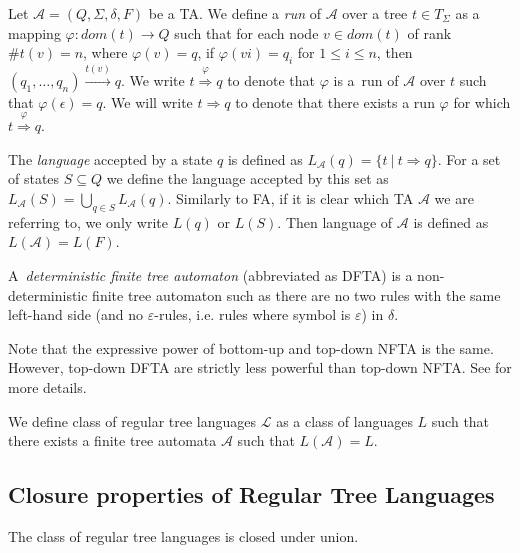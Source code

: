 Let $\mathcal{A} = (Q, \Sigma, \delta, F)$ be a TA. We define a \emph{run} of $\mathcal{A}$ over a tree $t \in T_\Sigma$ as a mapping $\varphi: dom(t) \to Q$ such that for each node $v \in dom(t)$ of rank $\#t(v) = n$, where $\varphi(v) = q$, if $\varphi(vi) = q_i$ for $1 \leq i \leq n$, then $(q_1,\ldots,q_n) \overset{t(v)}{\longrightarrow} q$. We write $t \overset{\varphi}{\Longrightarrow} q$ to denote that $\varphi$ is a~run of $\mathcal{A}$ over $t$ such that $\varphi(\epsilon) = q$. We will write $t \Longrightarrow q$ to denote that there exists a run $\varphi$ for which $t \overset{\varphi}{\Longrightarrow} q$.

The \emph{language} accepted by a state $q$ is defined as $L_{\mathcal{A}}(q) = \{t\ |\ t \Rightarrow q\}$. For a set of states $S \subseteq Q$ we define the language accepted by this set as $L_{\mathcal{A}}(S) = \bigcup_{q \in S} L_{\mathcal{A}}(q)$. Similarly to FA, if it is clear which TA $\mathcal{A}$ we are referring to, we only write $L(q)$ or $L(S)$. Then language of $\mathcal{A}$ is defined as $L(\mathcal{A}) = L(F)$.

\begin{defz}
A~\emph{deterministic finite tree automaton} (abbreviated as DFTA) is a non-deterministic finite tree automaton such as there are no two rules with the same left-hand side (and no $\varepsilon$-rules, i.e. rules where symbol is $\varepsilon$) in $\delta$.
\end{defz}

Note that the expressive power of bottom-up and top-down NFTA is the same. However, top-down DFTA are strictly less powerful than top-down NFTA. See \cite{tata} for more details.

\begin{defz}
We define class of regular tree languages $\mathcal{L}$ as a class of languages $L$ such that there exists a finite tree automata $\mathcal{A}$ such that $L(\mathcal{A}) = L$.
\end{defz}



\subsection{Closure properties of Regular Tree Languages}

\begin{theorem}
 The class of regular tree languages is closed under union.
\end{theorem}

